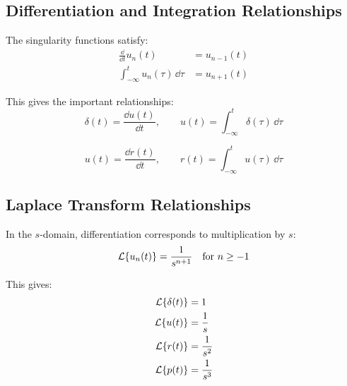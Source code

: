 \subsection{Differentiation and Integration Relationships}

The singularity functions satisfy:
\begin{align}
\frac{\dd}{\dd t}u_n(t) &= u_{n-1}(t) \\
\int_{-\infty}^t u_n(\tau) \, \dd\tau &= u_{n+1}(t)
\end{align}

This gives the important relationships:
\begin{equation}
\boxed{\delta(t) = \frac{\dd u(t)}{\dd t}, \qquad u(t) = \int_{-\infty}^t \delta(\tau) \, \dd\tau}
\end{equation}

\begin{equation}
\boxed{u(t) = \frac{\dd r(t)}{\dd t}, \qquad r(t) = \int_{-\infty}^t u(\tau) \, \dd\tau}
\end{equation}

\subsection{Laplace Transform Relationships}

In the $s$-domain, differentiation corresponds to multiplication by $s$:
\begin{equation}
\mathcal{L}\{u_n(t)\} = \frac{1}{s^{n+1}} \quad \text{for } n \geq -1
\end{equation}

This gives:
\begin{align}
\mathcal{L}\{\delta(t)\} &= 1 \\
\mathcal{L}\{u(t)\} &= \frac{1}{s} \\
\mathcal{L}\{r(t)\} &= \frac{1}{s^2} \\
\mathcal{L}\{p(t)\} &= \frac{1}{s^3}
\end{align}

